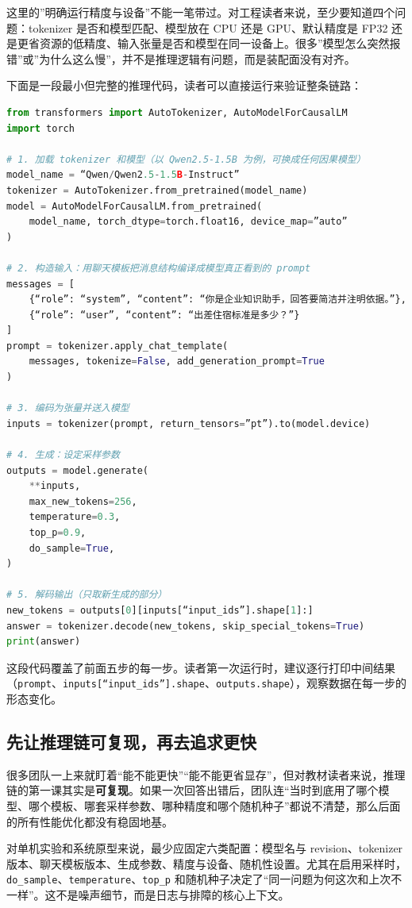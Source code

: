 这里的”明确运行精度与设备”不能一笔带过。对工程读者来说，至少要知道四个问题：tokenizer 是否和模型匹配、模型放在 CPU 还是 GPU、默认精度是 FP32 还是更省资源的低精度、输入张量是否和模型在同一设备上。很多”模型怎么突然报错”或”为什么这么慢”，并不是推理逻辑有问题，而是装配面没有对齐。

下面是一段最小但完整的推理代码，读者可以直接运行来验证整条链路：

\begin{lstlisting}[language=Python]
from transformers import AutoTokenizer, AutoModelForCausalLM
import torch

# 1. 加载 tokenizer 和模型（以 Qwen2.5-1.5B 为例，可换成任何因果模型）
model_name = “Qwen/Qwen2.5-1.5B-Instruct”
tokenizer = AutoTokenizer.from_pretrained(model_name)
model = AutoModelForCausalLM.from_pretrained(
    model_name, torch_dtype=torch.float16, device_map=”auto”
)

# 2. 构造输入：用聊天模板把消息结构编译成模型真正看到的 prompt
messages = [
    {“role”: “system”, “content”: “你是企业知识助手，回答要简洁并注明依据。”},
    {“role”: “user”, “content”: “出差住宿标准是多少？”}
]
prompt = tokenizer.apply_chat_template(
    messages, tokenize=False, add_generation_prompt=True
)

# 3. 编码为张量并送入模型
inputs = tokenizer(prompt, return_tensors=”pt”).to(model.device)

# 4. 生成：设定采样参数
outputs = model.generate(
    **inputs,
    max_new_tokens=256,
    temperature=0.3,
    top_p=0.9,
    do_sample=True,
)

# 5. 解码输出（只取新生成的部分）
new_tokens = outputs[0][inputs[“input_ids”].shape[1]:]
answer = tokenizer.decode(new_tokens, skip_special_tokens=True)
print(answer)
\end{lstlisting}

这段代码覆盖了前面五步的每一步。读者第一次运行时，建议逐行打印中间结果（\texttt{prompt}、\texttt{inputs[“input\_ids”].shape}、\texttt{outputs.shape}），观察数据在每一步的形态变化。

\subsection{先让推理链可复现，再去追求更快}
很多团队一上来就盯着“能不能更快”“能不能更省显存”，但对教材读者来说，推理链的第一课其实是\textbf{可复现}。如果一次回答出错后，团队连“当时到底用了哪个模型、哪个模板、哪套采样参数、哪种精度和哪个随机种子”都说不清楚，那么后面的所有性能优化都没有稳固地基。

对单机实验和系统原型来说，最少应固定六类配置：模型名与 revision、tokenizer 版本、聊天模板版本、生成参数、精度与设备、随机性设置。尤其在启用采样时，\texttt{do\_sample}、\texttt{temperature}、\texttt{top\_p} 和随机种子决定了“同一问题为何这次和上次不一样”。这不是噪声细节，而是日志与排障的核心上下文。

